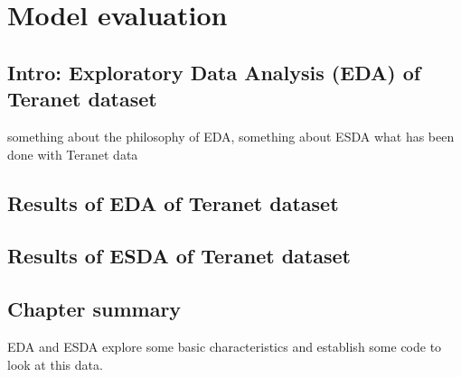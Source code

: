 \chapter{Model evaluation} \label{ch:model_evaluation}

\section{Intro: Exploratory Data Analysis (EDA) of Teranet dataset} \label{sec:eda}

something about the philosophy of EDA,
something about ESDA
what has been done with Teranet data

\section{Results of EDA of Teranet dataset} \label{sec:eda_results_teranet}


\section{Results of ESDA of Teranet dataset} \label{sec:esda_results_teranet}


\section{Chapter summary} \label{sec:eda_summary}
EDA and ESDA explore some basic characteristics and establish some code to look at this data.
